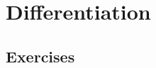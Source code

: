 \chapter{Differentiation}

\section{Exercises}

\setcounter{exercise}{5}

\setcounter{exercise}{8}

